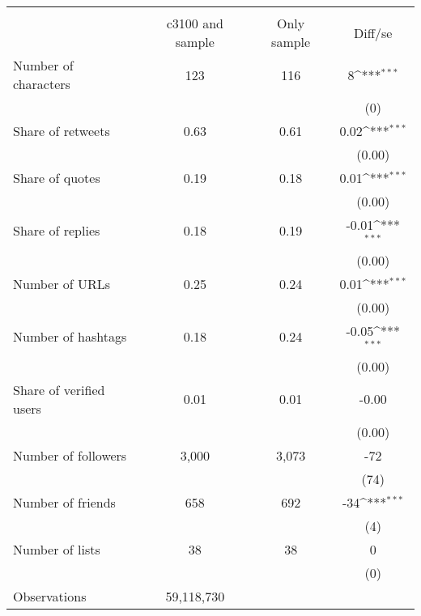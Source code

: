{
\def\sym#1{\ifmmode^{#1}\else\(^{#1}\)\fi}
\begin{tabular}{l*{1}{ccc}}
\hline\hline
                    &\multicolumn{3}{c}{}                           \\
                    &c3100 and sample& Only sample&     Diff/se         \\
\hline
Number of characters&         123&         116&           8\sym{***}\\
                    &            &            &         (0)         \\
Share of retweets   &        0.63&        0.61&        0.02\sym{***}\\
                    &            &            &      (0.00)         \\
Share of quotes     &        0.19&        0.18&        0.01\sym{***}\\
                    &            &            &      (0.00)         \\
Share of replies    &        0.18&        0.19&       -0.01\sym{***}\\
                    &            &            &      (0.00)         \\
Number of URLs      &        0.25&        0.24&        0.01\sym{***}\\
                    &            &            &      (0.00)         \\
Number of hashtags  &        0.18&        0.24&       -0.05\sym{***}\\
                    &            &            &      (0.00)         \\
Share of verified users&        0.01&        0.01&       -0.00         \\
                    &            &            &      (0.00)         \\
Number of followers &       3,000&       3,073&         -72         \\
                    &            &            &        (74)         \\
Number of friends   &         658&         692&         -34\sym{***}\\
                    &            &            &         (4)         \\
Number of lists     &          38&          38&           0         \\
                    &            &            &         (0)         \\
\hline
Observations        &  59,118,730&            &                     \\
\hline\hline
\end{tabular}
}
